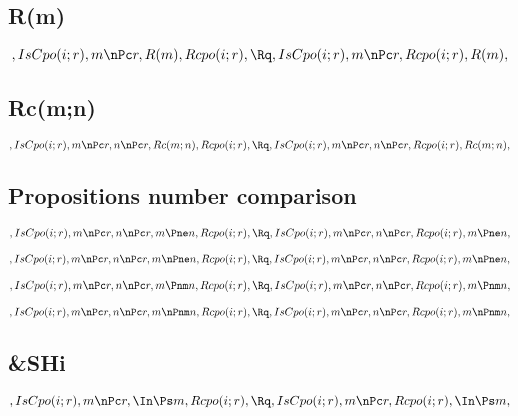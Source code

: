 \bigskip
\bigskip
\subsection{R(m)}
\[, IsCpo(i;r), m \nPc r, R(m), Rcpo(i;r), \Rq ,IsCpo(i;r), m \nPc r, Rcpo(i;r), R(m), \]


\bigskip
\bigskip
\subsection{Rc(m;n)}
\[, IsCpo(i;r), m \nPc r, n \nPc r, Rc(m;n), Rcpo(i;r), \Rq , IsCpo(i;r), m \nPc r, n \nPc r, Rcpo(i;r), Rc(m;n), \]


\bigskip
\bigskip
\subsection{Propositions number comparison}
\[, IsCpo(i;r), m \nPc r, n \nPc r, m \Pne n, Rcpo(i;r), \Rq , IsCpo(i;r), m \nPc r, n \nPc r, Rcpo(i;r), m \Pne n, \]

\[, IsCpo(i;r), m \nPc r, n \nPc r, m \nPne n, Rcpo(i;r), \Rq , IsCpo(i;r), m \nPc r, n \nPc r, Rcpo(i;r), m \nPne n, \]

\[, IsCpo(i;r), m \nPc r, n \nPc r, m \Pnm n, Rcpo(i;r), \Rq , IsCpo(i;r), m \nPc r, n \nPc r, Rcpo(i;r), m \Pnm n, \]

\[, IsCpo(i;r), m \nPc r, n \nPc r, m \nPnm n, Rcpo(i;r), \Rq , IsCpo(i;r), m \nPc r, n \nPc r, Rcpo(i;r), m \nPnm n, \]


\bigskip
\bigskip
\subsection{&SHi}
\[, IsCpo(i;r), m \nPc r, \In \Ps m, Rcpo(i;r), \Rq ,IsCpo(i;r), m \nPc r, Rcpo(i;r), \In \Ps m, \]



\bigskip
\bigskip
